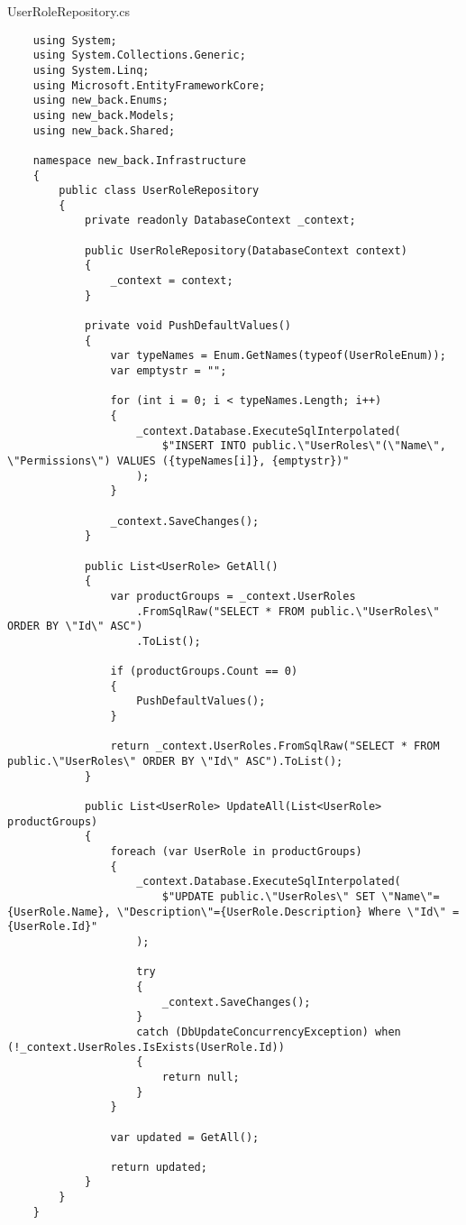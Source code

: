 UserRoleRepository.cs
\lstset{style=sharpc}
\begin{lstlisting}
    using System;
    using System.Collections.Generic;
    using System.Linq;
    using Microsoft.EntityFrameworkCore;
    using new_back.Enums;
    using new_back.Models;
    using new_back.Shared;
    
    namespace new_back.Infrastructure
    {
        public class UserRoleRepository
        {
            private readonly DatabaseContext _context;
            
            public UserRoleRepository(DatabaseContext context)
            {
                _context = context;
            }
    
            private void PushDefaultValues()
            {
                var typeNames = Enum.GetNames(typeof(UserRoleEnum));
                var emptystr = "";
    
                for (int i = 0; i < typeNames.Length; i++)
                {
                    _context.Database.ExecuteSqlInterpolated(
                        $"INSERT INTO public.\"UserRoles\"(\"Name\", \"Permissions\") VALUES ({typeNames[i]}, {emptystr})"
                    );
                }
                
                _context.SaveChanges();
            }
            
            public List<UserRole> GetAll()
            {
                var productGroups = _context.UserRoles
                    .FromSqlRaw("SELECT * FROM public.\"UserRoles\" ORDER BY \"Id\" ASC")
                    .ToList();
    
                if (productGroups.Count == 0)
                {
                    PushDefaultValues();
                }
                
                return _context.UserRoles.FromSqlRaw("SELECT * FROM public.\"UserRoles\" ORDER BY \"Id\" ASC").ToList();
            }
            
            public List<UserRole> UpdateAll(List<UserRole> productGroups)
            {
                foreach (var UserRole in productGroups)
                {
                    _context.Database.ExecuteSqlInterpolated(
                        $"UPDATE public.\"UserRoles\" SET \"Name\"={UserRole.Name}, \"Description\"={UserRole.Description} Where \"Id\" = {UserRole.Id}"
                    );
                    
                    try
                    {
                        _context.SaveChanges();
                    }
                    catch (DbUpdateConcurrencyException) when (!_context.UserRoles.IsExists(UserRole.Id))
                    {
                        return null;
                    }
                }
    
                var updated = GetAll();
    
                return updated;
            }
        }
    }
\end{lstlisting}

